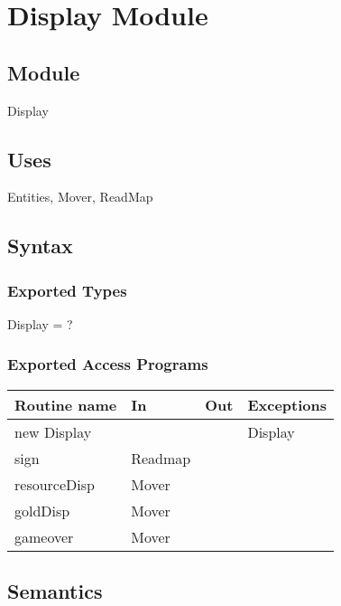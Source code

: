 \documentclass[12pt]{article}
\begin{document}
\newpage

\section*{Display Module}

\subsection*{Module}

Display

\subsection*{Uses}

Entities, Mover, ReadMap

\subsection*{Syntax}

\subsubsection*{Exported Types}

Display = ?

\subsubsection*{Exported Access Programs}

\begin{tabular}{| l | l | l | l |}
\hline
\textbf{Routine name} & \textbf{In} & \textbf{Out} & \textbf{Exceptions}\\
\hline
new Display & ~ & ~  & Display\\
\hline
sign & Readmap & ~ & ~\\
\hline
resourceDisp & Mover & ~ & ~\\
\hline
goldDisp & Mover & ~ & ~\\
\hline
gameover & Mover & ~ & ~\\
\hline
\end{tabular}

\subsection*{Semantics}
\end{document}
